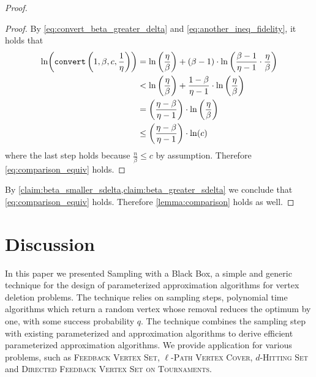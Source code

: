 \documentclass[letterpaper,11pt]{article}
\newenvironment{claimproof}{\begin{proof}\renewcommand{\qedsymbol}{$\lrcorner$}}{\end{proof}}
\newcommand{\1}[1]{\mathds{1}\left[#1\right]}
\newcommand{\runtime}[1][\alpha, \beta, c, q]{\textnormal{\texttt{convert}}\left(#1\right)}
\newcommand{\pathvc}[1]{\ensuremath{#1}\textsc{-Path Vertex Cover}\xspace}
\newcommand{\hs}[1]{\ensuremath{#1}\textsc{-Hitting Set}\xspace}
\newcommand{\fvs}{\textsc{Feedback Vertex Set}\xspace}
\newcommand{\dfvst}{\textsc{Directed Feedback Vertex Set on Tournaments}\xspace}
\begin{document}
\begin{proof}
\begin{claimproof}
		By \eqref{eq:convert_beta_greater_delta} and \eqref{eq:another_ineq_fidelity}, it holds that
		\begin{align*}
			\ln\biggl(\runtime[1,\beta,c,\frac{1}{\eta}]\biggr) &= \ln\left( \frac{\eta}{\beta} \right) + (\beta - 1) \cdot \ln\left( \frac{\beta - 1}{\eta - 1} \cdot \frac{\eta}{\beta} \right)\\
										    &< \ln\left( \frac{\eta}{\beta} \right) + \frac{1- \beta}{\eta - 1} \cdot \ln\left( \frac{\eta}{\beta} \right) \\
										    &= \left( \frac{\eta - \beta}{\eta - 1} \right) \cdot \ln\left( \frac{\eta}{\beta} \right) \\
										    &\leq \left( \frac{\eta - \beta}{\eta - 1} \right) \cdot \ln(c)
		\end{align*}
		where the last step holds because $\frac{n}{\beta} \leq c$ by assumption.
		Therefore \eqref{eq:comparison_equiv} holds.
	\end{claimproof}

	By \cref{claim:beta_smaller_sdelta,claim:beta_greater_sdelta} we conclude that \eqref{eq:comparison_equiv} holds.
	Therefore \cref{lemma:comparison} holds as well.
\end{proof}
 
\section{Discussion}
\label{sec:discussion}


In this paper we presented Sampling with a Black Box, a simple and generic technique for the design of parameterized approximation algorithms for vertex deletion problems. The technique relies on sampling steps, polynomial time algorithms which return a random vertex whose removal reduces the optimum by one, with some success probability $q$. The technique combines the sampling step with existing parameterized and approximation algorithms to derive efficient parameterized approximation algorithms. We provide application for various problems, such as \fvs, \pathvc{\ell}, \hs{d} and \dfvst. 
\end{document}
